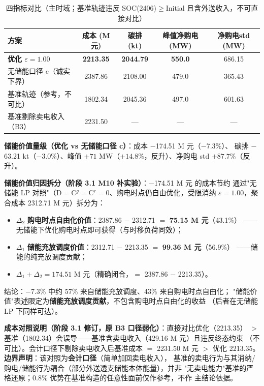 \documentclass{internal-report}
\begin{document}
\begin{table}[h]
\centering
\footnotesize
\begin{tabular}{lcccc}
\toprule
方案 & 成本 (M元) & 碳排 (kt) & 峰值净购电 (MW) & 净购电std (MW) \\
\midrule
\textbf{优化 $\varepsilon{=}1.00$} & \textbf{2213.35} & \textbf{2044.79} & \textbf{550.0} & 686.15 \\
无储能口径 c（诚实下界） & 2387.86 & 2108.00 & 479.0 & 365.43 \\
基准轨迹（参考，不可比） & 1802.34 & 2045.36 & 497.0 & 601.63 \\
基准剔除卖电收入（B3） & 2231.50 & --- & --- & --- \\
\bottomrule
\end{tabular}
\caption{四指标对比（主时域；基准轨迹违反 SOC(2406)$\ge$Initial 且含外送收入，不可直接对比）}
\label{tab:compare}
\end{table}

\textbf{储能价值量级（优化 vs 无储能口径 c）}：成本 $-$174.51 M 元（$-$7.3\%）、
碳排 $-$63.21 kt（$-$3.0\%）、峰值 $+71$ MW（$+14.8\%$，反升）、净购电 std $+87.7\%$（反升）。

\textbf{储能价值归因拆分（阶段 3.1 M10 补实验）}：$-$174.51 M 元 的成本节约
通过"无储能 LP 对照"（D$=$C$^g$$=$C$^r$$=$0、购电时点仍自由优化，受限消纳
$\varepsilon{=}1.00$，聚合成本 2312.71 M 元）拆分为：
\begin{itemize}
  \item $\Delta_2$ \textbf{购电时点自由化价值}：2387.86 $-$ 2312.71 $=$ \textbf{75.15 M 元}（43.1\%）
        ——无储能下优化购电时点即可获得（与时移负荷同效）；
  \item $\Delta_1$ \textbf{储能充放调度价值}：2312.71 $-$ 2213.35 $=$ \textbf{99.36 M 元}（56.9\%）
        ——储能的纯充放调度贡献；
  \item $\Delta_1+\Delta_2 = 174.51$ M 元（精确闭合，$=$ 2387.86 $-$ 2213.35）。
\end{itemize}
结论：$-$7.3\% 中约 57\% 来自储能充放调度、43\% 来自购电时点自由化；
"储能价值"表述限定为\textbf{储能充放调度贡献}，不包含购电时点自由化的收益
（后者在无储能 LP 下同样可达）。

\textbf{成本对照说明（阶段 3.1 修订，原 B3 口径弱化）}：直接对比优化（2213.35）
$>$ 基准（1802.34）会误导——基准含卖电收入（429.16 M 元）且违反终态约束
（不可比）。会计口径下剔除卖电收入后基准成本 $=$ 2231.50 M 元 $>$ 优化
2213.35。\textbf{边界声明}：该对照为\textbf{会计口径}（简单加回卖电收入），
基准的卖电行为与其消纳/购电/储能行为耦合（部分外送透支储能本体能量），并非
"无卖电能力"基准的严格还原；0.8\% 优势在基准构造的任意性面前仅作参考，不作
主结论依据。
\end{document}
